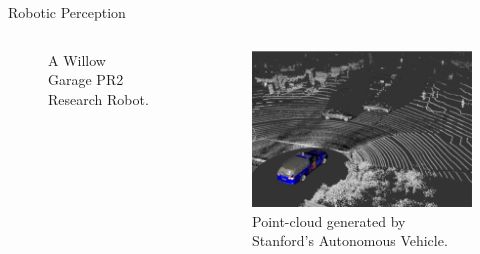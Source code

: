 \documentclass{beamer}
\newcommand\Fontsmall{\fontsize{6}{5}\selectfont}
\begin{document}
\begin{frame}{Robotic Perception}
\begin{columns}[T]
\begin{column}{.333\textwidth}
\begin{figure}
                \caption{A Willow Garage PR2 Research Robot. \Fontsmall{Image: Copyright Willow Garage.}}
            \end{figure}
        \end{column}
        \begin{column}{.666\textwidth}
            \begin{figure}
                \includegraphics[width=.86\textwidth]{Images/stanley-scan.png}
                \caption{Point-cloud generated by Stanford's Autonomous Vehicle. \Fontsmall{Image: Copyright David Stavens.}}
            \end{figure}
        \end{column}
  \end{columns} 
\end{frame}
\end{document}
